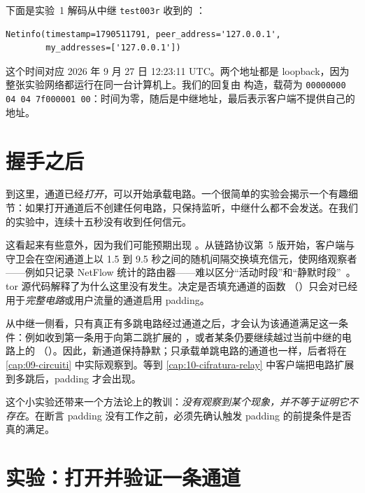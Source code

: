 下面是实验~1 解码从中继 \texttt{test003r} 收到的 ：

\begin{lstlisting}[numbers=none]
Netinfo(timestamp=1790511791, peer_address='127.0.0.1',
        my_addresses=['127.0.0.1'])
\end{lstlisting}

这个时间对应 2026 年 9 月 27 日 12:23:11 UTC。两个地址都是 loopback，因为整张实验网络都运行在同一台计算机上。我们的回复由  构造，载荷为 \texttt{00000000 04 04 7f000001 00}：时间为零，随后是中继地址，最后表示客户端不提供自己的地址。

\section{握手之后}\label{sec:canale-dopo}

到这里，通道已经\emph{打开}，可以开始承载电路。一个很简单的实验会揭示一个有趣细节：如果打开通道后不创建任何电路，只保持监听，中继什么都不会发送。在我们的实验中，连续十五秒没有收到任何信元。

这看起来有些意外，因为我们可能预期出现 。从链路协议第~5 版开始，客户端与守卫会在空闲通道上以 1.5 到 9.5 秒之间的随机间隔交换填充信元，使网络观察者——例如只记录 NetFlow 统计的路由器——难以区分“活动时段”和“静默时段”~。tor 源代码解释了为什么这里没有发生。决定是否填充通道的函数 （）只会对已经用于\emph{完整电路}或用户流量的通道启用 padding。

从中继一侧看，只有真正有多跳电路经过通道之后，才会认为该通道满足这一条件：例如收到第一条用于向第二跳扩展的 ，或者某条仍要继续越过当前中继的电路上的 （）。因此，新通道保持静默；只承载单跳电路的通道也一样，后者将在 \cref{cap:09-circuiti} 中实际观察到。等到 \cref{cap:10-cifratura-relay} 中客户端把电路扩展到多跳后，padding 才会出现。

这个小实验还带来一个方法论上的教训：\emph{没有观察到某个现象，并不等于证明它不存在}。在断言 padding 没有工作之前，必须先确认触发 padding 的前提条件是否真的满足。

\section{实验：打开并验证一条通道}\label{sec:lab-canale}

